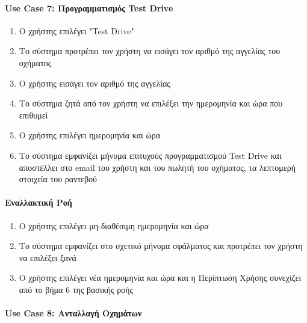 \documentclass{../ol-softwaremanual}
\begin{document}
	\paragraph{\en Use Case 7: \gr Προγραμματισμός \en Test Drive \gr}
	
	\begin{enumerate}
		\item Ο χρήστης επιλέγει \en "Test Drive" \gr
		\item Το σύστημα προτρέπει τον χρήστη να εισάγει τον αριθμό της αγγελίας του οχήματος
		\item Ο χρήστης εισάγει τον αριθμό της αγγελίας
		\item Το σύστημα ζητά από τον χρήστη να επιλέξει την ημερομηνία και ώρα που επιθυμεί 
		\item Ο χρήστης επιλέγει ημερομηνία και ώρα
		\item Το σύστημα εμφανίζει μήνυμα επιτυχούς προγραμματισμού \en Test Drive \gr και αποστέλλει στο \en email \gr του χρήστη και του πωλητή του οχήματος, τα λεπτομερή στοιχεία του ραντεβού 
	\end{enumerate}

	\paragraph{Εναλλακτική Ροή}
	
	\begin{enumerate}
		\item Ο χρήστης επιλέγει μη-διαθέσιμη ημερομηνία και ώρα
		\item Το σύστημα εμφανίζει στο σχετικό μήνυμα σφάλματος και προτρέπει τον χρήστη να επιλέξει ξανά
		\item Ο χρήστης επιλέγει νέα ημερομηνία και ώρα και η Περίπτωση Χρήσης συνεχίζει από το βήμα 6 της βασικής ροής
	\end{enumerate}


    \paragraph{\en Use Case 8: \gr  Ανταλλαγή Οχημάτων \gr}
    
\end{document}
